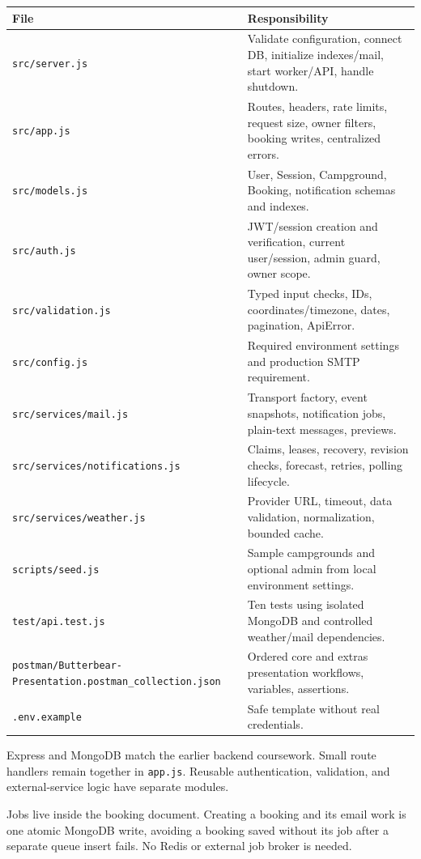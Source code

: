 \documentclass[10pt,a4paper]{article}
\newcommand{\code}[1]{{\small\nolinkurl{#1}}}
\newcommand{\topic}[1]{\par\vspace{2mm}{\large\bfseries\color{navy}#1\par}}
\begin{document}
\begin{tabularx}{\linewidth}{@{}p{49mm}X@{}}
\toprule
File & Responsibility\\
\midrule
\code{src/server.js} & Validate configuration, connect DB, initialize indexes/mail, start worker/API, handle shutdown.\\
\code{src/app.js} & Routes, headers, rate limits, request size, owner filters, booking writes, centralized errors.\\
\code{src/models.js} & User, Session, Campground, Booking, notification schemas and indexes.\\
\code{src/auth.js} & JWT/session creation and verification, current user/session, admin guard, owner scope.\\
\code{src/validation.js} & Typed input checks, IDs, coordinates/timezone, dates, pagination, ApiError.\\
\code{src/config.js} & Required environment settings and production SMTP requirement.\\
\code{src/services/mail.js} & Transport factory, event snapshots, notification jobs, plain-text messages, previews.\\
\code{src/services/notifications.js} & Claims, leases, recovery, revision checks, forecast, retries, polling lifecycle.\\
\code{src/services/weather.js} & Provider URL, timeout, data validation, normalization, bounded cache.\\
\code{scripts/seed.js} & Sample campgrounds and optional admin from local environment settings.\\
\code{test/api.test.js} & Ten tests using isolated MongoDB and controlled weather/mail dependencies.\\
\code{postman/Butterbear-Presentation.postman_collection.json} & Ordered core and extras presentation workflows, variables, assertions.\\
\code{.env.example} & Safe template without real credentials.\\
\bottomrule
\end{tabularx}

\topic{Architecture rationale}
Express and MongoDB match the earlier backend coursework. Small route handlers remain together in \code{app.js}. Reusable authentication, validation, and external-service logic have separate modules.

Jobs live inside the booking document. Creating a booking and its email work is one atomic MongoDB write, avoiding a booking saved without its job after a separate queue insert fails. No Redis or external job broker is needed.
\end{document}
